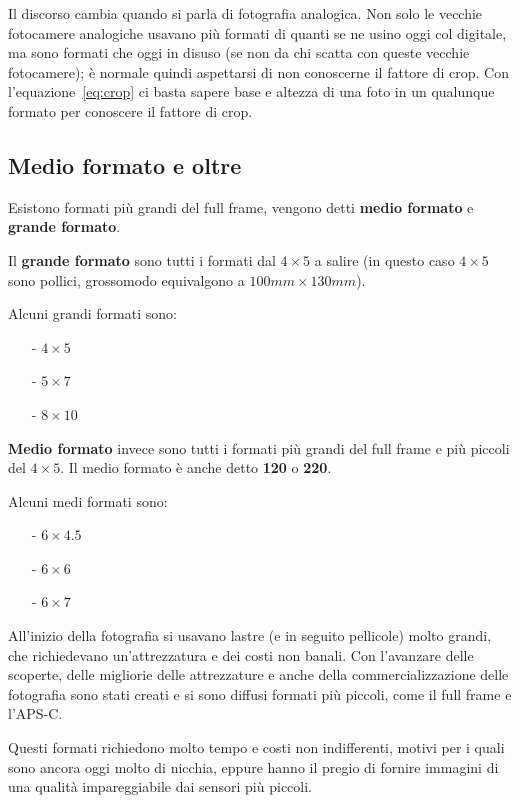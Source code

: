 Il discorso cambia quando si parla di fotografia analogica.
Non solo le vecchie fotocamere analogiche usavano più formati di quanti se ne usino oggi col digitale, ma sono formati che oggi in disuso (se non da chi scatta con queste vecchie fotocamere); è normale quindi aspettarsi di non conoscerne il fattore di crop.
Con l'equazione~\ref{eq:crop} ci basta sapere base e altezza di una foto in un qualunque formato per conoscere il fattore di crop.


\subsection{Medio formato e oltre} \label{subsec:sensorimedioformato}
Esistono formati più grandi del full frame, vengono detti \textbf{medio formato} e \textbf{grande formato}.

Il \textbf{grande formato} sono tutti i formati dal $4 \times 5$ a salire (in questo caso $4 \times 5$ sono pollici, grossomodo equivalgono a $100mm \times 130mm$).

Alcuni grandi formati sono:
\begin{itemize}
    \item[-] $4 \times 5$
    \item[-] $5 \times 7$
    \item[-] $8 \times 10$
\end{itemize}

\textbf{Medio formato} invece sono tutti i formati più grandi del full frame e più piccoli del $4 \times 5$. Il medio formato è anche detto \textbf{120} o \textbf{220}.

Alcuni medi formati sono:
\begin{itemize}
    \item[-] $6 \times 4.5$
    \item[-] $6 \times 6$
    \item[-] $6 \times 7$
\end{itemize}

All'inizio della fotografia si usavano lastre (e in seguito pellicole) molto grandi, che richiedevano un'attrezzatura e dei costi non banali. Con l'avanzare delle scoperte, delle migliorie delle attrezzature e anche della commercializzazione delle fotografia sono stati creati e si sono diffusi formati più piccoli, come il full frame e l'APS-C.

Questi formati richiedono molto tempo e costi non indifferenti, motivi per i quali sono ancora oggi molto di nicchia, eppure hanno il pregio di fornire immagini di una qualità impareggiabile dai sensori più piccoli.

